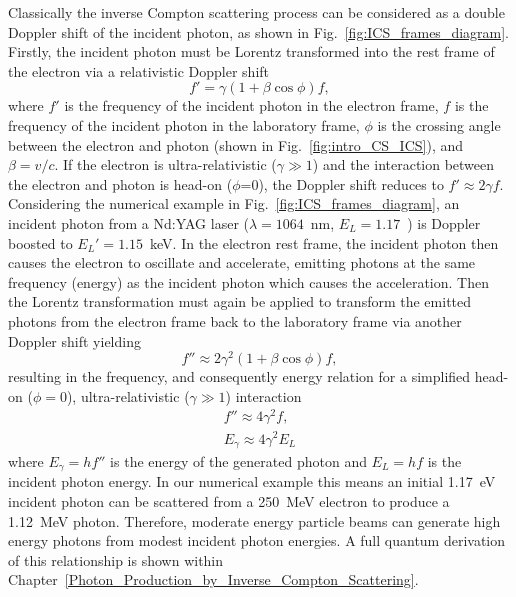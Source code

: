 \documentclass[../main.tex]{subfiles}
\begin{document}
Classically the inverse Compton scattering process can be considered as a double Doppler shift of the incident photon, as shown in Fig.~\ref{fig:ICS_frames_diagram}. Firstly, the incident photon must be Lorentz transformed into the rest frame of the electron via a relativistic Doppler shift
\begin{equation}
f'=\gamma\left(1+\beta\cos\phi\right)f,
\label{eq:Doppler_shift}    
\end{equation}
where $f'$ is the frequency of the incident photon in the electron frame, $f$ is the frequency of the incident photon in the laboratory frame, $\phi$ is the crossing angle between the electron and photon (shown in Fig.~\ref{fig:intro_CS_ICS}), and $\beta = v/c$. If the electron is ultra-relativistic ($\gamma \gg 1$) and the interaction between the electron and photon is head-on ($\phi$=0), the Doppler shift reduces to $f'\approx2\gamma f$. Considering the numerical example in Fig.~\ref{fig:ICS_frames_diagram}, an incident photon from a Nd:YAG laser ($\lambda = 1064$~\si{\nano\meter}, $E_{L} = 1.17$~\si{\electronvolts}) is Doppler boosted to $E_{L}' = 1.15$~\si{\kilo\electronvolt}. In the electron rest frame, the incident photon then causes the electron to oscillate and accelerate, emitting photons at the same frequency (energy) as the incident photon which causes the acceleration. Then the Lorentz transformation must again be applied to transform the emitted photons from the electron frame back to the laboratory frame via another Doppler shift yielding  
\begin{equation}
f'' \approx 2\gamma^{2}\left(1+\beta\cos\phi\right)f, 
\label{eq:2nd_Doppler_shift}    
\end{equation}
resulting in the frequency, and consequently energy relation for a simplified head-on ($\phi=0$), ultra-relativistic ($\gamma \gg 1$) interaction 
\begin{align}
f'' \approx 4\gamma^{2}f, \nonumber \\
E_{\gamma} \approx 4\gamma^{2}E_{L}
\end{align}
where $E_{\gamma} = hf''$ is the energy of the generated photon and $E_{L} = hf$ is the incident photon energy. In our numerical example this means an initial 1.17~\si{\electronvolt} incident photon can be scattered from a 250~\si{\mega\electronvolt} electron to produce a 1.12~\si{\mega\electronvolt} photon. Therefore, moderate energy particle beams can generate high energy photons from modest incident photon energies. A full quantum derivation of this relationship is shown within Chapter~\ref{Photon_Production_by_Inverse_Compton_Scattering}. 
 
\end{document}
